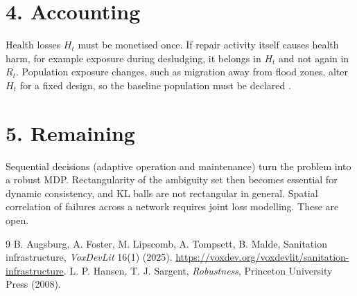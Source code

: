 \documentclass[11pt]{article}
\theoremstyle{definition}
\begin{document}
\section*{4. Accounting}
Health losses $H_t$ must be monetised once. If repair activity itself causes health harm, for example exposure during
desludging, it belongs in $H_t$ and not again in $R_t$. Population exposure changes, such as migration away from flood
zones, alter $H_t$ for a fixed design, so the baseline population must be declared \cite{afl}.

\section*{5. Remaining}
Sequential decisions (adaptive operation and maintenance) turn the problem into a robust MDP. Rectangularity of the
ambiguity set then becomes essential for dynamic consistency, and KL balls are not rectangular in general. Spatial
correlation of failures across a network requires joint loss modelling. These are open.

\begin{thebibliography}{9}
 B. Augsburg, A. Foster, M. Lipscomb, A. Tompsett, B. Malde, Sanitation infrastructure, \emph{VoxDevLit} 16(1) (2025). \url{https://voxdev.org/voxdevlit/sanitation-infrastructure}.
 L. P. Hansen, T. J. Sargent, \emph{Robustness}, Princeton University Press (2008).
\end{thebibliography}
\end{document}
